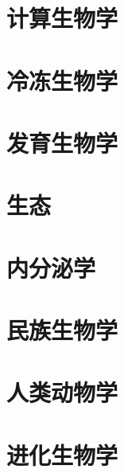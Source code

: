 \documentclass[UTF8]{NatureUniverse}
\begin{document}
\section{计算生物学}
\section{冷冻生物学}
\section{发育生物学}
\section{生态}
\section{内分泌学}
\section{民族生物学}
\section{人类动物学}
\section{进化生物学}
\end{document}
